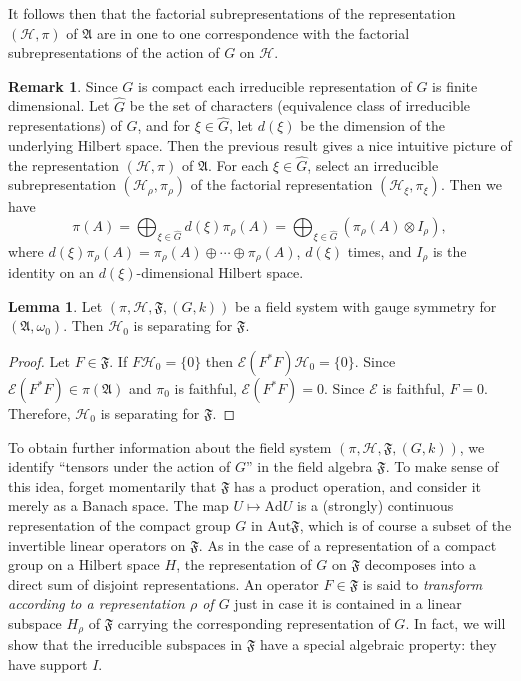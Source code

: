 \documentclass[12pt]{article}
\newcommand{\alg}[1]{\mathfrak{#1}}
\theoremstyle{definition}
\newtheorem{lemma}[thm]{Lemma}
\theoremstyle{definition}
\newtheorem{note}[thm]{Remark}
\theoremstyle{remark}
\def\2#1{{\mathcal #1}}
\def\4#1{{\mathscr #1}}
\def\al#1{{\mathfrak #1}}
\def\om{\omega} \def\Om{\Omega} \def\dd{\partial} \def\D{\Delta}
\newcommand{\Aut}{\mathrm{Aut}}
\newcommand{\fields}{(\pi ,\2H ,\alg{F},(G,k))}
\begin{document}
It follows then that the factorial subrepresentations of the
representation $(\2H ,\pi )$ of $\al A$ are in one to one
correspondence with the factorial subrepresentations of the action of
$G$ on $\2H$.

\begin{note} Since $G$ is compact each irreducible
  representation of $G$ is finite dimensional.  Let
  $\hat{G}$ be the set of characters (equivalence class
  of irreducible representations) of $G$, and for $\xi
  \in \hat{G}$, let $d(\xi )$ be the dimension of the
  underlying Hilbert space.  Then the previous result
  gives a nice intuitive picture of the representation
  $(\2H ,\pi )$ of $\al A$.  For each $\xi \in
  \hat{G}$, select an irreducible subrepresentation
  $(\2H _\rho ,\pi _\rho )$ of the factorial
  representation $(\2H _\xi ,\pi _\xi )$.  Then we have
$$ \pi (A) = \bigoplus _{\xi \in \hat{G}} d(\xi )\pi _{\rho }(A) =
\bigoplus _{\xi \in \hat{G}}(\pi _{\rho}(A)\otimes
I_\rho ) ,$$ where $d(\xi )\pi _\rho (A)=\pi _\rho
(A)\oplus \cdots \oplus \pi _\rho (A)$, $d(\xi )$
times, and $I_\rho$ is the identity on an $d(\xi
)$-dimensional Hilbert space.
\end{note}  


\begin{lemma} Let $\fields$ be a field system with gauge symmetry for
  $(\al A,\om _0 )$.  Then $\2H _0$ is separating for $\al
  F$.  \end{lemma}

\begin{proof} Let $F\in \al F$.  If $F\2H _0=\{ 0\}$
  then $\4E (F^*F)\2H _0=\{ 0\}$.  Since $\4E (F^*F)\in
  \pi (\al A)$ and $\pi _0$ is faithful, $\4E
  (F^*F)=0$.  Since $\4E$ is faithful, $F=0$.
  Therefore, $\2H _0$ is separating for $\al F$.
\end{proof}


To obtain further information about the field system $\fields$, we
identify ``tensors under the action of $G$'' in the field algebra $\al
F$.  To make sense of this idea, forget momentarily that $\al F$ has a
product operation, and consider it merely as a Banach space.  The map
$U\mapsto \mathrm{Ad}U$ is a (strongly) continuous representation of
the compact group $G$ in $\Aut \al F$, which is of course a subset of
the invertible linear operators on $\al F$.  As in the case of a
representation of a compact group on a Hilbert space $H$, the
representation of $G$ on $\al F$ decomposes into a direct sum of
disjoint representations.  An operator $F\in \al F$ is said to
\emph{transform according to a representation $\rho$ of $G$} just in
case it is contained in a linear subspace $H_\rho$ of $\al F$ carrying
the corresponding representation of $G$.  In fact, we will show that
the irreducible subspaces in $\al F$ have a special algebraic
property: they have support $I$.
\end{document}
